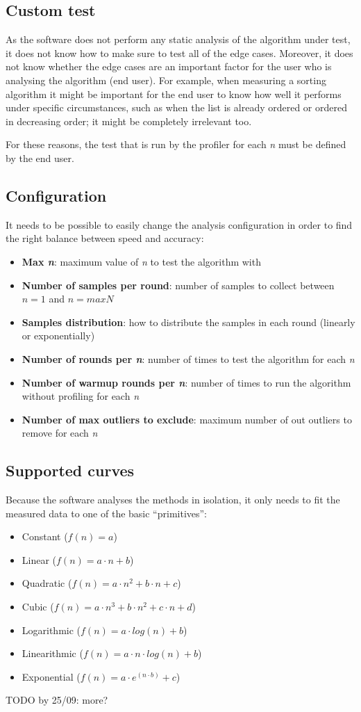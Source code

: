 \subsection{Custom test}
As the software does not perform any static analysis of the algorithm under test, it does not know how to make sure to test all of the edge cases. Moreover, it does not know whether the edge cases are an important factor for the user who is analysing the algorithm (end user). For example, when measuring a sorting algorithm it might be important for the end user to know how well it performs under specific circumstances, such as when the list is already ordered or ordered in decreasing order; it might be completely irrelevant too.

\noindent For these reasons, the test that is run by the profiler for each \emph{n} must be defined by the end user.

\subsection{Configuration}
It needs to be possible to easily change the analysis configuration in order to find the right balance between speed and accuracy:
\begin{itemize}
  \item \textbf{Max \emph{n}}: maximum value of \emph{n} to test the algorithm with
  \item \textbf{Number of samples per round}: number of samples to collect between $n = 1$ and $n = maxN$
  \item \textbf{Samples distribution}: how to distribute the samples in each round (linearly or exponentially)
  \item \textbf{Number of rounds per \emph{n}}: number of times to test the algorithm for each \emph{n}
  \item \textbf{Number of warmup rounds per \emph{n}}: number of times to run the algorithm without profiling for each \emph{n}
  \item \textbf{Number of max outliers to exclude}: maximum number of out outliers to remove for each \emph{n}
\end{itemize}

\subsection{Supported curves}
Because the software analyses the methods in isolation, it only needs to fit the measured data to one of the basic \enquote{primitives}:
\begin{itemize}
  \item Constant ($f(n) = a$)
  \item Linear ($f(n) = a \cdot n + b$)
  \item Quadratic ($f(n) = a \cdot n^2 + b \cdot n + c$)
  \item Cubic ($f(n) = a \cdot n^3 + b \cdot n^2 + c \cdot n + d$)
  \item Logarithmic ($f(n) = a \cdot log(n) + b$)
  \item Linearithmic ($f(n) = a \cdot n \cdot log(n) + b$)
  \item Exponential ($f(n) = a \cdot e^{(n \cdot b)} + c$)
\end{itemize}


\noindent TODO by 25/09: more?